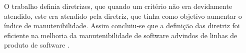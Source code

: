 O trabalho definia diretrizes, que quando um critério não era devidamente atendido, este era atendido pela diretriz, que tinha como objetivo aumentar o índice de manutenibilidade. Assim concluiu-se que a definição das diretriz foi eficiente na melhoria da manutenibilidade de software advindos de linhas de produto de software \cite{gustavo2013}.
